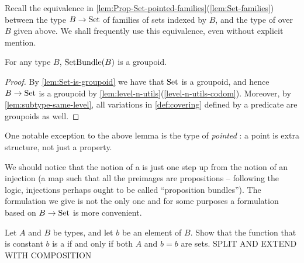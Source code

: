 Recall the equivalence in \cref{lem:Prop-Set-pointed-families}(\ref{lem:Set-families})
between the type $B\to\mathord{\mathrm{Set}}$ of families of sets indexed by $B$, and the type
of \coverings over $B$ given above.
We shall frequently use this equivalence, even without explicit mention.

\begin{lemma}\label{lem:setbundle-is-groupoid}
For any type $B$, $\operatorname{\mathrm{SetBundle}}(B)$ is a groupoid.
\end{lemma}
\begin{proof}
By \cref{lem:Set-is-groupoid} we have that $\mathord{\mathrm{Set}}$ is a groupoid, 
and hence $B\to\mathord{\mathrm{Set}}$ is a groupoid by \cref{lem:level-n-utils}(\ref{level-n-utils-codom}).
Moreover, by \cref{lem:subtype-same-level}, all variations in \cref{def:covering}
defined by a predicate are groupoids as well.
\end{proof}
One notable exception to the above lemma is the type of \emph{pointed} \coverings:
a point is extra structure, not just a property.

We should notice that the notion of a \covering is just one step up from the notion of an
injection (a map such that all the preimages are propositions -- 
following the logic, injections perhaps ought to be called ``proposition bundles''). 
The formulation we give is not the only one and for some purposes a formulation
based on $B\to\mathord{\mathrm{Set}}$ is more convenient.

\begin{xca}\label{xca:constant-cover}
Let $A$ and $B$ be types, and let $b$ be an element of $B$.
Show that the function that is constant $b$ is a \covering
if and only if both $A$ and $b=b$ are sets. SPLIT AND EXTEND WITH COMPOSITION
\end{xca}

